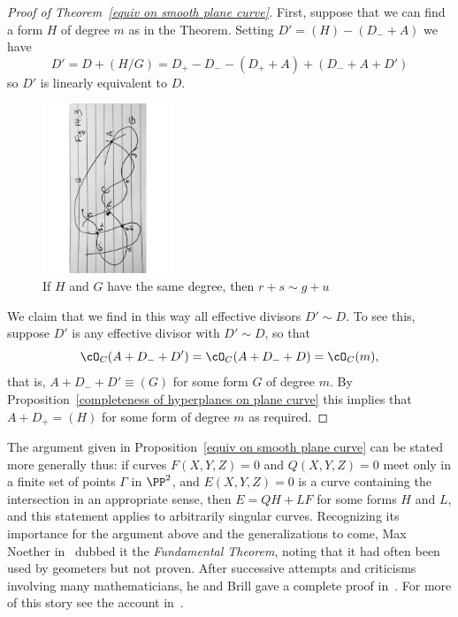 \begin{proof}[Proof of Theorem~\ref{equiv on smooth plane curve}]
First, suppose that we can find a form $H$ of degree $m$ as in the Theorem.
Setting $D' = (H) -(D_{-}+A)$ we have
$$
D' = D + (H/G) = D_{+}- D_{-} - (D_{+}+A)+(D_{-}+A+D')
$$
so $D'$ is linearly equivalent to $D$. 

\begin{figure}
\begin{center}
\centerline {\includegraphics[height=2in]{"Fig14.3.pdf"}}
\caption{If $H$ and $G$ have the same degree, then $r+s\sim g+u$}
\label{Fig14.3}
\end{center}
\end{figure}

We claim that we find in this way all effective divisors $D' \sim D$. 
To see this, suppose $D'$ is any effective divisor with $D' \sim D$, so that
$$
\cO_C(A+D_{-}+D') = \cO_C(A+D_{-}+D)  = \cO_C(m),
$$
that is, $A+D_{-}+D' \equiv (G)$ for some form $G$ of degree $m$. By Proposition~\ref{completeness of hyperplanes on plane curve}
this implies that $A+D_{+} = (H)$ for some form of degree $m$ as required.
\end{proof}


The argument given in Proposition~\ref{equiv on smooth plane curve} can be stated more generally thus:  if curves $F(X,Y,Z)=0$ and $Q(X,Y,Z)=0$ 
meet only in a finite set of points $\Gamma$ in $\PP^{2}$, and $E(X,Y,Z) = 0$ is a curve containing the intersection in an appropriate sense,
then $E = QH +LF$ for some forms $H$ and $L$, and this statement applies to arbitrarily singular curves. Recognizing its importance for the argument above and the generalizations to come, Max Noether in~\cite{Noether1873} dubbed it the \emph{Fundamental Theorem}, 
noting that it had often been used by geometers but not proven. After successive attempts and 
criticisms involving many mathematicians, he and Brill gave a complete proof in~\cite{Brill-Noether}. For more of this story see the account in~\cite{eisenbud-gray}.

